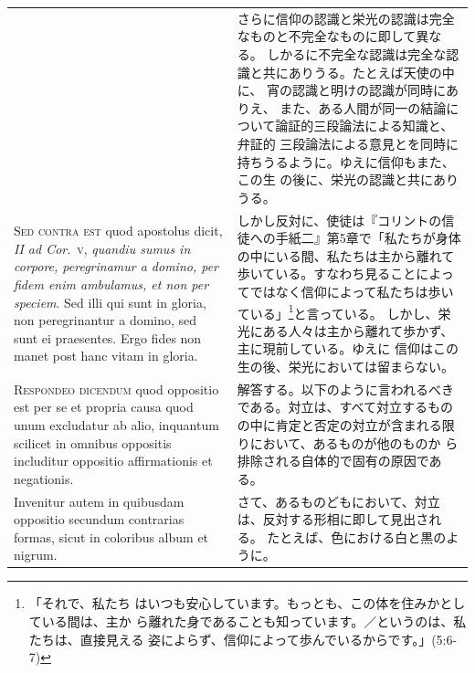 \documentclass[paper=a4paper,fontsize=10pt,jafontsize=9pt,titlepage]{jlreq}
\begin{document}
\begin{longtable}{p{21em}p{21em}}
&

 さらに信仰の認識と栄光の認識は完全なものと不完全なものに即して異なる。
 しかるに不完全な認識は完全な認識と共にありうる。たとえば天使の中に、
 宵の認識と明けの認識が同時にありえ、
 また、ある人間が同一の結論について論証的三段論法による知識と、弁証的
 三段論法による意見とを同時に持ちうるように。ゆえに信仰もまた、この生
 の後に、栄光の認識と共にありうる。

\\




 {\scshape Sed contra est} quod apostolus dicit, {\itshape II ad
 Cor}.~{\scshape v}, {\itshape quandiu sumus in corpore, peregrinamur
 a domino, per fidem enim ambulamus, et non per speciem}. Sed illi qui
 sunt in gloria, non peregrinantur a domino, sed sunt ei
 praesentes. Ergo fides non manet post hanc vitam in gloria.
 
&

 しかし反対に、使徒は『コリントの信徒への手紙二』第5章で「私たちが身体
 の中にいる間、私たちは主から離れて歩いている。すなわち見ることによっ
 てではなく信仰によって私たちは歩いている」\footnote{「それで、私たち
 はいつも安心しています。もっとも、この体を住みかとしている間は、主か
 ら離れた身であることも知っています。／というのは、私たちは、直接見える
 姿によらず、信仰によって歩んでいるからです。」(5:6-7) }と言っている。
 しかし、栄光にある人々は主から離れて歩かず、主に現前している。ゆえに
 信仰はこの生の後、栄光においては留まらない。

 \\
 
 {\scshape Respondeo dicendum} quod oppositio est per se et propria
 causa quod unum excludatur ab alio, inquantum scilicet in omnibus
 oppositis includitur oppositio affirmationis et negationis.

 &

 解答する。以下のように言われるべきである。対立は、すべて対立するもの
 の中に肯定と否定の対立が含まれる限りにおいて、あるものが他のものか
 ら排除される自体的で固有の原因である。

 \\

 Invenitur autem in quibusdam oppositio secundum contrarias formas,
 sicut in coloribus album et nigrum.
 
&

 さて、あるものどもにおいて、対立は、反対する形相に即して見出される。
 たとえば、色における白と黒のように。

\\


\end{longtable}
\end{document}
